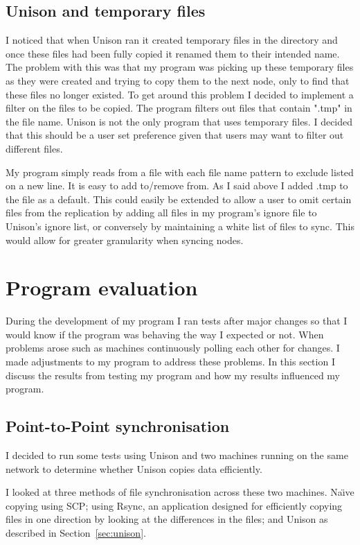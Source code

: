 \documentclass[12pt]{article}
\begin{document}
\subsection{Unison and temporary files}
\label{sec:uni_and_tmp}
I noticed that when Unison ran it created temporary files in the
directory and once these files had been fully copied it renamed
them to their intended name. The problem with this was that my program
was picking up these temporary files as they were created and trying to
copy them to the next node, only to find that these files no longer existed.
To get around this problem I decided to implement a filter on the files to
be copied. The program filters out files that contain ".tmp" in the file name.
Unison is not the only program that uses temporary files. I decided that this
should be a user set preference given that users may want to filter out different
files.

My program simply reads from a file with each file name pattern to exclude
listed on a new line. It is easy to add to/remove from. As I said above
I added .tmp to the file as a default. This could easily be extended
to allow a user to omit certain files from the replication by adding
all files in my program's ignore file to Unison's ignore list, or conversely
by maintaining a white list of files to sync. This would allow for
greater granularity when syncing nodes.

\newpage
\section{Program evaluation}
During the development of my program I ran tests after major
changes so that I would know if the program was behaving the
way I expected or not.
When problems arose such as machines continuously polling each
other for changes. I made adjustments to my program to address
these problems.
In this section I discuss
the results from testing my program
and how my results influenced my program.

\subsection{Point-to-Point synchronisation}
\label{sec:point_to_point}
I decided to run some tests using Unison 
and two machines running on the same network to 
determine whether Unison copies data efficiently.

I looked at three methods of file synchronisation across
these two machines. Na\"{\i}ve copying using SCP; using Rsync, an application
designed for efficiently copying files in one direction by looking at
the differences in the files; and Unison as described in Section~\ref{sec:unison}.
\end{document}
